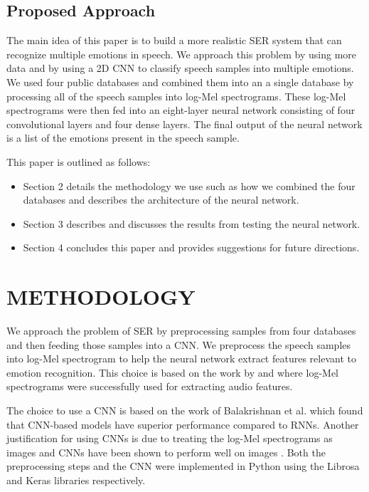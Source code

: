 \documentclass[a4paper, 10pt, conference]{ieeeconf}      %
\begin{document}
\subsection{Proposed Approach}

The main idea of this paper is to build a more realistic SER system that can recognize multiple emotions in speech. We approach this problem by using more data and by using a 2D CNN to classify speech samples into multiple emotions. We used four public databases and combined them into an a single database by processing all of the speech samples into log-Mel spectrograms. These log-Mel spectrograms were then fed into an eight-layer neural network consisting of four convolutional layers and four dense layers. The final output of the neural network is a list of the emotions present in the speech sample.

This paper is outlined as follows:
\begin{itemize}
	\item Section 2 details the methodology we use such as how we combined the four databases and describes the architecture of the neural network.
	\item Section 3 describes and discusses the results from testing the neural network.
	\item Section 4 concludes this paper and provides suggestions for future directions.
\end{itemize}


\section{METHODOLOGY}

We approach the problem of SER by preprocessing samples from four databases and then feeding those samples into a CNN. We preprocess the speech samples into log-Mel spectrogram to help the neural network extract features relevant to emotion recognition. This choice is based on the work by \cite{Engel2019} and \cite{Badshah2017} where log-Mel spectrograms were successfully used for extracting audio features. 

The choice to use a CNN is based on the work of Balakrishnan et al. \cite{Balakrishnan2017} which found that CNN-based models have superior performance compared to RNNs. Another justification for using CNNs is due to treating the log-Mel spectrograms as images and CNNs have been shown to perform well on images \cite{Krizhevsky2012}. Both the preprocessing steps and the CNN were implemented in Python using the Librosa \cite{McFee2015} and Keras \cite{Chollet2015} libraries respectively.
\end{document}
